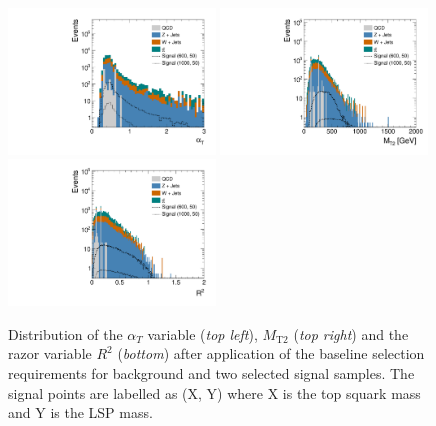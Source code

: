 \begin{figure}[!t]
  \centering
  \begin{minipage}[c]{1.\textwidth}
    \begin{center}
      \includegraphics[width=0.49\textwidth]{figures/Stop_DeltaPhiSelection_AlphaT.pdf}  
      \includegraphics[width=0.49\textwidth]{figures/Stop_DeltaPhiSelection_MT2.pdf} \\
      \includegraphics[width=0.49\textwidth]{figures/Stop_DeltaPhiSelection_Razor_R.pdf}
    \end{center}
  \end{minipage}

  \caption{Distribution of the $\alpha_T$ variable (\textit{top left}), $M_\mathrm{T2}$ (\textit{top right}) and  the razor variable $R^2$ (\textit{bottom}) after application of the baseline selection requirements for background and two selected signal samples. The signal points are labelled as (X, Y) where X is the top squark mass and Y is the LSP mass.}
  \label{fig:stop_baseline_kin_vars}
\end{figure}


